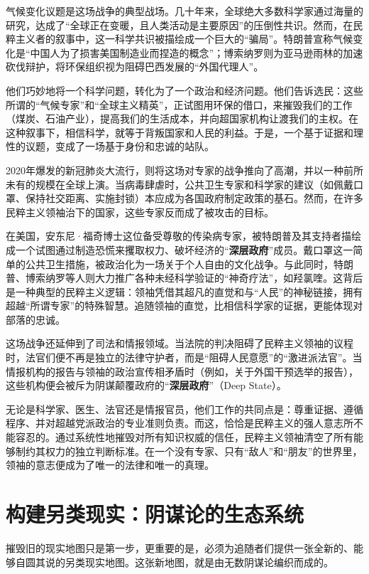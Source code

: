 气候变化议题是这场战争的典型战场。几十年来，全球绝大多数科学家通过海量的研究，达成了“全球正在变暖，且人类活动是主要原因”的压倒性共识。然而，在民粹主义者的叙事中，这一科学共识被描绘成一个巨大的“骗局”。特朗普宣称气候变化是“中国人为了损害美国制造业而捏造的概念”；博索纳罗则为亚马逊雨林的加速砍伐辩护，将环保组织视为阻碍巴西发展的“外国代理人”。

他们巧妙地将一个科学问题，转化为了一个政治和经济问题。他们告诉选民：这些所谓的“气候专家”和“全球主义精英”，正试图用环保的借口，来摧毁我们的工作（煤炭、石油产业），提高我们的生活成本，并向超国家机构让渡我们的主权。在这种叙事下，相信科学，就等于背叛国家和人民的利益。于是，一个基于证据和理性的议题，变成了一场基于身份和忠诚的站队。

2020年爆发的新冠肺炎大流行，则将这场对专家的战争推向了高潮，并以一种前所未有的规模在全球上演。当病毒肆虐时，公共卫生专家和科学家的建议（如佩戴口罩、保持社交距离、实施封锁）本应成为各国政府制定政策的基石。然而，在许多民粹主义领袖治下的国家，这些专家反而成了被攻击的目标。

在美国，安东尼·福奇博士这位备受尊敬的传染病专家，被特朗普及其支持者描绘成一个试图通过制造恐慌来攫取权力、破坏经济的“\textbf{深层政府}”成员。戴口罩这一简单的公共卫生措施，被政治化为一场关于个人自由的文化战争。与此同时，特朗普、博索纳罗等人则大力推广各种未经科学验证的“神奇疗法”，如羟氯喹。这背后是一种典型的民粹主义逻辑：领袖凭借其超凡的直觉和与“人民”的神秘链接，拥有超越“所谓专家”的特殊智慧。追随领袖的直觉，比相信科学家的证据，更能体现对部落的忠诚。

这场战争还延伸到了司法和情报领域。当法院的判决阻碍了民粹主义领袖的议程时，法官们便不再是独立的法律守护者，而是“阻碍人民意愿”的“激进派法官”。当情报机构的报告与领袖的政治宣传相矛盾时（例如，关于外国干预选举的报告），这些机构便会被斥为阴谋颠覆政府的“\textbf{深层政府}”（Deep State）。

无论是科学家、医生、法官还是情报官员，他们工作的共同点是：尊重证据、遵循程序、并对超越党派政治的专业准则负责。而这，恰恰是民粹主义的强人意志所不能容忍的。通过系统性地摧毁对所有知识权威的信任，民粹主义领袖清空了所有能够制约其权力的独立判断标准。在一个没有专家、只有“敌人”和“朋友”的世界里，领袖的意志便成为了唯一的法律和唯一的真理。

\section{构建另类现实：阴谋论的生态系统}
摧毁旧的现实地图只是第一步，更重要的是，必须为追随者们提供一张全新的、能够自圆其说的另类现实地图。这张新地图，就是由无数阴谋论编织而成的。

